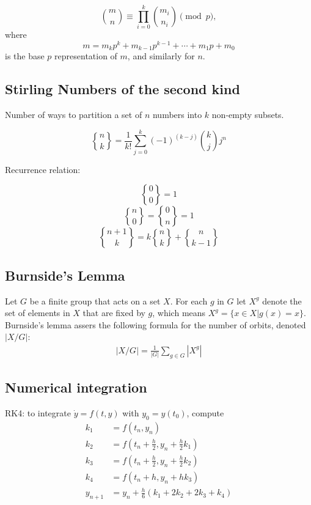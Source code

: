 \documentclass[a4paper,10pt]{article}
\begin{document}
\begin{landscape}
\begin{multicols}{2}
$$\binom{m}{n}\equiv\prod_{i=0}^k\binom{m_i}{n_i}\pmod p,$$
where
$$m=m_kp^k+m_{k-1}p^{k-1}+\cdots +m_1p+m_0$$
is the base $p$ representation of $m$, and similarly for $n$.

\subsection{Stirling Numbers of the second kind}
Number of ways to partition a set of $n$ numbers into $k$ non-empty subsets.

$${n \brace k}=\frac{1}{k!}\sum_{j=0}^{k}(-1)^{(k-j)}{k \choose j}j^n$$

Recurrence relation:

  $${0 \brace 0}=1$$
  $${n \brace 0}={0 \brace n}=1$$
  $${n+1 \brace k}=k{n \brace k}+{n \brace k-1}$$


\subsection{Burnside's Lemma}
Let $G$ be a finite group that acts on a set $X$. For each $g$ in $G$ let $X^g$ denote the set of elements in $X$ that are fixed by $g$, which means $X^g=\{x\in X| g(x)=x\}$. Burnside's lemma assers the following formula for the number of orbits, denoted $|X/G|$:
\begin{align*}
|X/G|=\frac{1}{|G|} \sum_{g\in G} |X^g|
\end{align*}

\subsection{Numerical integration}
RK4: to integrate $\dot{y} = f(t, y)$ with $y_0 = y(t_0)$, compute
\begin{align*}
  k_1 &= f(t_n, y_n) \\
  k_2 &= f(t_n + \frac h 2, y_n + \frac h 2 k_1) \\
  k_3 &= f(t_n + \frac h 2, y_n + \frac h 2 k_2) \\
  k_4 &= f(t_n + h, y_n + h k_3) \\
  y_{n+1} &= y_n + \frac h 6 (k_1 + 2k_2 + 2k_3 + k_4) 
\end{align*}

\end{multicols}


\end{landscape}
\end{document}
